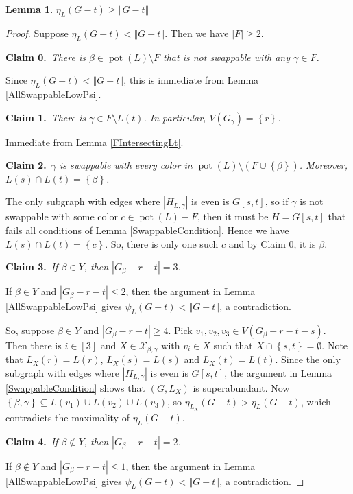 \documentclass[12pt]{article}
\theoremstyle{plain}
\newtheorem{lem}[thm]{Lemma}
\theoremstyle{definition}
\theoremstyle{remark}
\newcommand{\fancy}[1]{\mathcal{#1}}
\newcommand{\set}[1]{\left\{ #1 \right\}}
\newcommand{\card}[1]{\left|#1\right|}
\newcommand{\size}[1]{\left\Vert#1\right\Vert}
\newcommand{\irange}[1]{\left[#1\right]}
\newcommand{\parens}[1]{\left( #1 \right)}
\newcommand{\pot}{\operatorname{pot}}
\def\X{\fancy{X}}
\newcommand{\claim}[2]{{\bf Claim #1.}~{\it #2}~~}
\begin{document}
	\begin{lem}\label{EtaIsBig}
		$\eta_L(G - t) \ge \size{G - t}$
	\end{lem}
	\begin{proof}
		Suppose $\eta_L(G - t) < \size{G - t}$. Then we have $\card{F} \ge 2$. 
		
		\claim{0}{There is $\beta \in \pot(L) \setminus F$ that is not swappable with any $\gamma \in F$.}
		
		Since $\eta_L(G - t) < \size{G - t}$, this is immediate from Lemma \ref{AllSwappableLowPsi}.
		
		\claim{1}{There is $\gamma \in F \setminus L(t)$. In particular, $V(G_\gamma) = \set{r}$.}
			
			Immediate from Lemma \ref{FIntersectingLt}.
		
		\claim{2}{$\gamma$ is swappable with every color in $\pot(L) \setminus \parens{F \cup \set{\beta}}$.  Moreover, $L(s) \cap L(t) = \set{\beta}$.}
		
			The only subgraph with edges where $\card{H_{L, \gamma}}$ is even is $G[s, t]$, so if $\gamma$ is not swappable with some color $c \in \pot(L) - F$, then it must be $H = G[s, t]$ that fails all conditions of Lemma \ref{SwappableCondition}.  Hence we have $L(s) \cap L(t) = \set{c}$.  So, there is only one such $c$ and by Claim 0, it is $\beta$.
			
		\claim{3}{If $\beta \in Y$, then $\card{G_\beta - r - t} = 3$.}
		
			If $\beta \in Y$ and $\card{G_\beta - r - t} \le 2$, then the argument in Lemma \ref{AllSwappableLowPsi} gives $\psi_L(G - t) < \size{G - t}$, a contradiction.
			
			So, suppose $\beta \in Y$ and $\card{G_\beta - r - t} \ge 4$.  Pick $v_1, v_2, v_3 \in V(G_\beta - r - t - s)$.  Then there is $i \in \irange{3}$ and $X \in \X_{\beta,\gamma}$ with $v_i \in X$ such that $X \cap \set{s,t} = \emptyset$. Note that $L_X(r) = L(r)$, $L_X(s) = L(s)$ and $L_X(t) = L(t)$.  Since the only subgraph with edges where $\card{H_{L, \gamma}}$ is even is $G[s, t]$, the argument in Lemma \ref{SwappableCondition} shows that $(G,L_X)$ is superabundant.  Now $\set{\beta, \gamma} \subseteq L(v_1) \cup L(v_2) \cup L(v_3)$, so $\eta_{L_X}(G - t) > \eta_L(G - t)$, which contradicts the maximality of $\eta_L(G - t)$.
			
		\claim{4}{If $\beta \not \in Y$, then $\card{G_\beta - r - t} = 2$.}
		
		If $\beta \not \in Y$ and $\card{G_\beta - r - t} \le 1$, then the argument in Lemma \ref{AllSwappableLowPsi} gives $\psi_L(G - t) < \size{G - t}$, a contradiction.
		

\end{proof}
\end{document}

